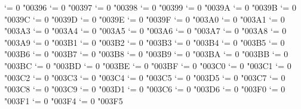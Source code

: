 {  \Umathcode `\Ζ = 0 \unimathfam "00396
  \Umathcode `\Η = 0 \unimathfam "00397
  \Umathcode `\Θ = 0 \unimathfam "00398
  \Umathcode `\Ι = 0 \unimathfam "00399
  \Umathcode `\Κ = 0 \unimathfam "0039A
  \Umathcode `\Λ = 0 \unimathfam "0039B
  \Umathcode `\Μ = 0 \unimathfam "0039C
  \Umathcode `\Ν = 0 \unimathfam "0039D
  \Umathcode `\Ξ = 0 \unimathfam "0039E
  \Umathcode `\Ο = 0 \unimathfam "0039F
  \Umathcode `\Π = 0 \unimathfam "003A0
  \Umathcode `\Ρ = 0 \unimathfam "003A1
  \Umathcode `\Σ = 0 \unimathfam "003A3
  \Umathcode `\Τ = 0 \unimathfam "003A4
  \Umathcode `\Υ = 0 \unimathfam "003A5
  \Umathcode `\Φ = 0 \unimathfam "003A6
  \Umathcode `\Χ = 0 \unimathfam "003A7
  \Umathcode `\Ψ = 0 \unimathfam "003A8
  \Umathcode `\Ω = 0 \unimathfam "003A9
  \Umathcode `\α = 0 \unimathfam "003B1
  \Umathcode `\β = 0 \unimathfam "003B2
  \Umathcode `\γ = 0 \unimathfam "003B3
  \Umathcode `\δ = 0 \unimathfam "003B4
  \Umathcode `\ε = 0 \unimathfam "003B5
  \Umathcode `\ζ = 0 \unimathfam "003B6
  \Umathcode `\η = 0 \unimathfam "003B7
  \Umathcode `\θ = 0 \unimathfam "003B8
  \Umathcode `\ι = 0 \unimathfam "003B9
  \Umathcode `\κ = 0 \unimathfam "003BA
  \Umathcode `\λ = 0 \unimathfam "003BB
  \Umathcode `\μ = 0 \unimathfam "003BC
  \Umathcode `\ν = 0 \unimathfam "003BD
  \Umathcode `\ξ = 0 \unimathfam "003BE
  \Umathcode `\ο = 0 \unimathfam "003BF
  \Umathcode `\π = 0 \unimathfam "003C0
  \Umathcode `\ρ = 0 \unimathfam "003C1
  \Umathcode `\ς = 0 \unimathfam "003C2
  \Umathcode `\σ = 0 \unimathfam "003C3
  \Umathcode `\τ = 0 \unimathfam "003C4
  \Umathcode `\υ = 0 \unimathfam "003C5
  \Umathcode `\φ = 0 \unimathfam "003D5
  \Umathcode `\χ = 0 \unimathfam "003C7
  \Umathcode `\ψ = 0 \unimathfam "003C8
  \Umathcode `\ω = 0 \unimathfam "003C9
  \Umathcode `\ϑ = 0 \unimathfam "003D1
  \Umathcode `\ϕ = 0 \unimathfam "003C6
  \Umathcode `\ϖ = 0 \unimathfam "003D6
  \Umathcode `\ϰ = 0 \unimathfam "003F0
  \Umathcode `\ϱ = 0 \unimathfam "003F1
  \Umathcode `\ϴ = 0 \unimathfam "003F4
  \Umathcode `\ϵ = 0 \unimathfam "003F5
\fi
\tenrm}

